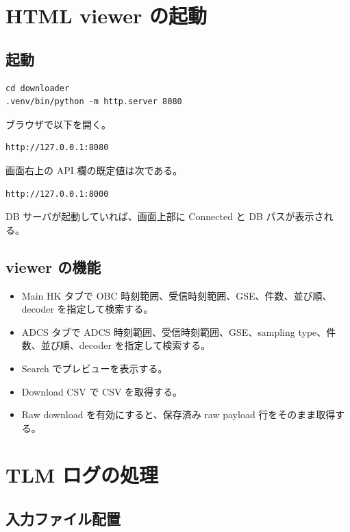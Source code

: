 \documentclass[a4paper,11pt]{ltjsarticle}
\begin{document}
\section{HTML viewer の起動}

\subsection{起動}

\begin{verbatim}
cd downloader
.venv/bin/python -m http.server 8080
\end{verbatim}

ブラウザで以下を開く。

\begin{verbatim}
http://127.0.0.1:8080
\end{verbatim}

画面右上の API 欄の既定値は次である。

\begin{verbatim}
http://127.0.0.1:8000
\end{verbatim}

DB サーバが起動していれば、画面上部に Connected と DB パスが表示される。

\subsection{viewer の機能}

\begin{itemize}
  \item Main HK タブで OBC 時刻範囲、受信時刻範囲、GSE、件数、並び順、decoder を指定して検索する。
  \item ADCS タブで ADCS 時刻範囲、受信時刻範囲、GSE、sampling type、件数、並び順、decoder を指定して検索する。
  \item Search でプレビューを表示する。
  \item Download CSV で CSV を取得する。
  \item Raw download を有効にすると、保存済み raw payload 行をそのまま取得する。
\end{itemize}

\section{TLM ログの処理}

\subsection{入力ファイル配置}
\end{document}
